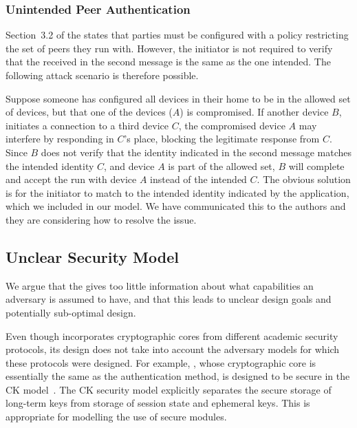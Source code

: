 \documentclass[runningheads]{llncs}
\begin{document}
\subsubsection{Unintended Peer Authentication}
Section~3.2 of the \mSpec{} states that parties must be configured
with a policy restricting the set of peers they run \mEdhoc{} with.
%
However, the initiator is not required to verify that the \mIdcredr{} received
in the second message is the same as the one intended.
%
The following attack scenario is therefore possible.
%

Suppose someone has configured all devices in their home to be in the
allowed set of devices, but that one of the devices ($A$) is compromised.
%
If another device $B$, initiates a connection to a third device $C$, the
compromised device $A$ may interfere by responding in $C$'s place, blocking
the legitimate response from $C$.
%
Since $B$ does not verify that the identity indicated in the second message
matches the intended identity $C$, and device $A$ is part of the allowed set,
$B$ will complete and accept the \mEdhoc{} run with device $A$ instead of the
intended $C$.
%
The obvious solution is for the initiator to match \mIdcredr{} to the intended
identity indicated by the application, which we included in our model.
%
We have communicated this to the \mEdhoc{} authors and they are considering
how to resolve the issue.
%

\subsection{Unclear Security Model}
We argue that the \mSpec{} gives too little information about what capabilities
an adversary is assumed to have, and that this leads to unclear design goals and
potentially sub-optimal design.
%

Even though \mEdhoc{} incorporates cryptographic cores from different academic
security protocols, its design does not take into account the adversary models
for which these protocols were designed.
%
For example, \mOptls{}, whose cryptographic core is essentially the same
as the \mStat{} authentication method, is designed to be secure in the CK
model~\cite{DBLP:conf/crypto/CanettiK02}.
%
The CK security model explicitly separates the secure storage of long-term
keys from storage of session state and ephemeral keys.
%
This is appropriate for modelling the use of secure modules.
%
\end{document}
